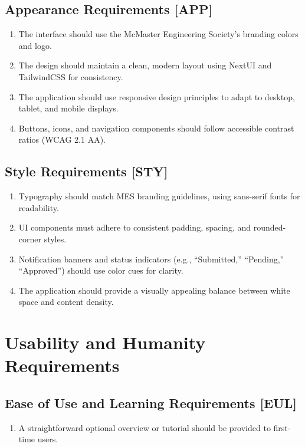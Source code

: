 \documentclass[12pt]{article}
\begin{document}
    \subsection{Appearance Requirements [APP]}
    \begin{enumerate}
        \item The interface should use the McMaster Engineering Society's branding colors and logo.
        \item The design should maintain a clean, modern layout using NextUI and TailwindCSS for consistency.
        \item The application should use responsive design principles to adapt to desktop, tablet, and mobile displays.
        \item Buttons, icons, and navigation components should follow accessible contrast ratios (WCAG 2.1 AA).
    \end{enumerate}

    \subsection{Style Requirements [STY]}
    \begin{enumerate}
        \item Typography should match MES branding guidelines, using sans-serif fonts for readability.
        \item UI components must adhere to consistent padding, spacing, and rounded-corner styles.
        \item Notification banners and status indicators (e.g., “Submitted,” “Pending,” “Approved”) should use color cues for clarity.
        \item The application should provide a visually appealing balance between white space and content density.
    \end{enumerate}
\section{Usability and Humanity Requirements}
  \subsection{Ease of Use and Learning Requirements [EUL]}
    \begin{enumerate}
      \item A straightforward optional overview or tutorial should be provided to first-time users.
    \end{enumerate}
\end{document}
